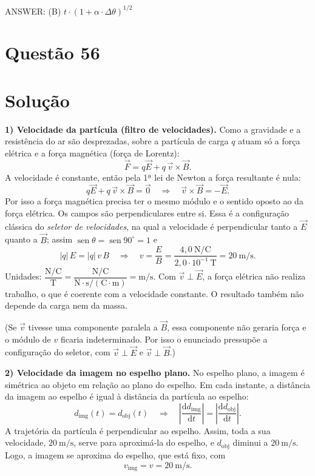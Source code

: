 \documentclass{article}%
\begin{document}
ANSWER: (B) $t\cdot(1+\alpha\cdot\Delta\theta)^{1/2}$%
\newpage%
\section*{Questão 56}

\section*{Solução}

\textbf{1) Velocidade da partícula (filtro de velocidades).}
Como a gravidade e a resistência do ar são desprezadas, sobre a partícula de carga $q$ atuam só a força elétrica e a força magnética (força de Lorentz):
\[
\vec F = q\vec E + q\,\vec v\times\vec B .
\]
A velocidade é constante, então pela 1ª lei de Newton a força resultante é nula:
\[
q\vec E + q\,\vec v\times\vec B = \vec 0 \quad\Longrightarrow\quad \vec v\times\vec B = -\vec E .
\]
Por isso a força magnética precisa ter o mesmo módulo e o sentido oposto ao da força elétrica. Os campos são perpendiculares entre si. Essa é a configuração clássica do \emph{seletor de velocidades}, na qual a velocidade é perpendicular tanto a $\vec E$ quanto a $\vec B$; assim $\operatorname{sen}\theta = \operatorname{sen}90^\circ = 1$ e
\[
|q|\,E = |q|\,v\,B \quad\Longrightarrow\quad v=\frac{E}{B}=\frac{4{,}0\ \text{N/C}}{2{,}0\cdot 10^{-1}\ \text{T}} = 20\ \text{m/s}.
\]
Unidades: $\dfrac{\text{N/C}}{\text{T}}=\dfrac{\text{N/C}}{\text{N}\cdot\text{s}/(\text{C}\cdot\text{m})}=\text{m/s}$. Com $\vec v\perp\vec E$, a força elétrica não realiza trabalho, o que é coerente com a velocidade constante. O resultado também não depende da carga nem da massa.

(Se $\vec v$ tivesse uma componente paralela a $\vec B$, essa componente não geraria força e o módulo de $v$ ficaria indeterminado. Por isso o enunciado pressupõe a configuração do seletor, com $\vec v \perp \vec E$ e $\vec v\perp\vec B$.)

\textbf{2) Velocidade da imagem no espelho plano.}
No espelho plano, a imagem é simétrica ao objeto em relação ao plano do espelho. Em cada instante, a distância da imagem ao espelho é igual à distância da partícula ao espelho:
\[
d_{\text{img}}(t)=d_{\text{obj}}(t)\quad\Longrightarrow\quad \left|\frac{\mathrm{d}d_{\text{img}}}{\mathrm{d}t}\right| = \left|\frac{\mathrm{d}d_{\text{obj}}}{\mathrm{d}t}\right| .
\]
A trajetória da partícula é perpendicular ao espelho. Assim, toda a sua velocidade, $20\ \text{m/s}$, serve para aproximá-la do espelho, e $d_{\text{obj}}$ diminui a $20\ \text{m/s}$. Logo, a imagem se aproxima do espelho, que está fixo, com
\[
v_{\text{img}} = v = 20\ \text{m/s}.
\]
\end{document}
